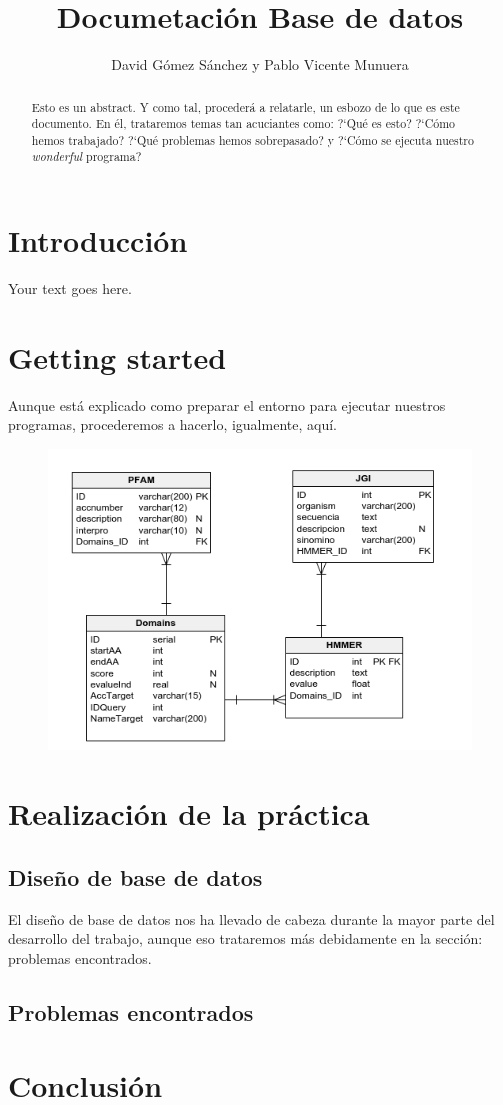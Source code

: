 \documentclass[11pt]{article} %
\title{Documetaci\'on Base de datos}
\author{David G\'omez S\'anchez y Pablo Vicente Munuera}
\date{} %
\begin{document}
\maketitle

\begin{abstract}

Esto es un abstract. Y como tal, proceder\'a a relatarle, un esbozo de lo que es este documento. En él, trataremos temas tan acuciantes como: ?`Qu\'e es esto? ?`C\'omo hemos trabajado? ?`Qu\'e problemas hemos sobrepasado? y ?`C\'omo se ejecuta nuestro \emph{wonderful} programa?

\end{abstract}

\section{Introducci\'on}

Your text goes here.

\section{Getting started}

Aunque est\'a explicado como preparar el entorno para ejecutar nuestros programas, procederemos a hacerlo, igualmente, aqu\'i.

\begin{figure}
\centering
\includegraphics[width=15cm]{design}
\caption{\label{ fig:Design}}
\end{figure}

\section{Realizaci\'on de la pr\'actica}

\subsection{Dise\~no de base de datos}

El dise\~no de base de datos nos ha llevado de cabeza durante la mayor parte del desarrollo del trabajo, aunque eso trataremos m\'as debidamente en la secci\'on: problemas encontrados.



\subsection{Problemas encontrados}

\section{Conclusi\'on}
\end{document}
